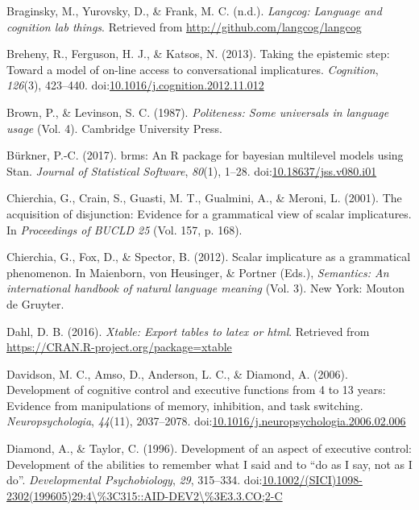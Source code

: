 \documentclass[man]{apa6}
\theoremstyle{definition}
\theoremstyle{definition}
\theoremstyle{definition}
\theoremstyle{remark}
\begin{document}
\hypertarget{ref-R-langcog}{}
Braginsky, M., Yurovsky, D., \& Frank, M. C. (n.d.). \emph{Langcog:
Language and cognition lab things}. Retrieved from
\url{http://github.com/langcog/langcog}

\hypertarget{ref-breheny2013}{}
Breheny, R., Ferguson, H. J., \& Katsos, N. (2013). Taking the epistemic
step: Toward a model of on-line access to conversational implicatures.
\emph{Cognition}, \emph{126}(3), 423--440.
doi:\href{https://doi.org/10.1016/j.cognition.2012.11.012}{10.1016/j.cognition.2012.11.012}

\hypertarget{ref-brown1987}{}
Brown, P., \& Levinson, S. C. (1987). \emph{Politeness: Some universals
in language usage} (Vol. 4). Cambridge University Press.

\hypertarget{ref-R-brms}{}
Bürkner, P.-C. (2017). brms: An R package for bayesian multilevel models
using Stan. \emph{Journal of Statistical Software}, \emph{80}(1), 1--28.
doi:\href{https://doi.org/10.18637/jss.v080.i01}{10.18637/jss.v080.i01}

\hypertarget{ref-chierchia2001}{}
Chierchia, G., Crain, S., Guasti, M. T., Gualmini, A., \& Meroni, L.
(2001). The acquisition of disjunction: Evidence for a grammatical view
of scalar implicatures. In \emph{Proceedings of BUCLD 25} (Vol. 157, p.
168).

\hypertarget{ref-chierchia2012}{}
Chierchia, G., Fox, D., \& Spector, B. (2012). Scalar implicature as a
grammatical phenomenon. In Maienborn, von Heusinger, \& Portner (Eds.),
\emph{Semantics: An international handbook of natural language meaning}
(Vol. 3). New York: Mouton de Gruyter.

\hypertarget{ref-R-xtable}{}
Dahl, D. B. (2016). \emph{Xtable: Export tables to latex or html}.
Retrieved from \url{https://CRAN.R-project.org/package=xtable}

\hypertarget{ref-davidson2006}{}
Davidson, M. C., Amso, D., Anderson, L. C., \& Diamond, A. (2006).
Development of cognitive control and executive functions from 4 to 13
years: Evidence from manipulations of memory, inhibition, and task
switching. \emph{Neuropsychologia}, \emph{44}(11), 2037--2078.
doi:\href{https://doi.org/10.1016/j.neuropsychologia.2006.02.006}{10.1016/j.neuropsychologia.2006.02.006}

\hypertarget{ref-diamond1996}{}
Diamond, A., \& Taylor, C. (1996). Development of an aspect of executive
control: Development of the abilities to remember what I said and to
``do as I say, not as I do''. \emph{Developmental Psychobiology},
\emph{29}, 315--334.
doi:\href{https://doi.org/10.1002/(SICI)1098-2302(199605)29:4/\%3C315::AID-DEV2/\%3E3.3.CO;2-C}{10.1002/(SICI)1098-2302(199605)29:4\textbackslash{}\%3C315::AID-DEV2\textbackslash{}\%3E3.3.CO;2-C}
\end{document}
